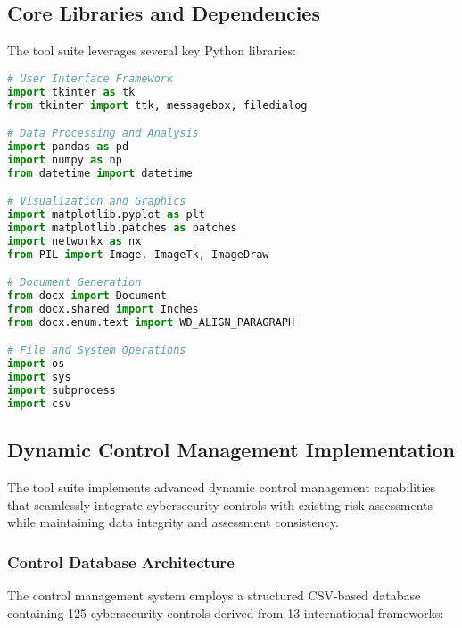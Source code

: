 \documentclass[binding=0.6cm]{sapthesis}
\begin{document}
\subsection{Core Libraries and Dependencies}

The tool suite leverages several key Python libraries:

\begin{lstlisting}[language=Python, caption=Core Dependencies Structure]
# User Interface Framework
import tkinter as tk
from tkinter import ttk, messagebox, filedialog

# Data Processing and Analysis
import pandas as pd
import numpy as np
from datetime import datetime

# Visualization and Graphics
import matplotlib.pyplot as plt
import matplotlib.patches as patches
import networkx as nx
from PIL import Image, ImageTk, ImageDraw

# Document Generation
from docx import Document
from docx.shared import Inches
from docx.enum.text import WD_ALIGN_PARAGRAPH

# File and System Operations
import os
import sys
import subprocess
import csv
\end{lstlisting}

\subsection{Dynamic Control Management Implementation}

The tool suite implements advanced dynamic control management capabilities that seamlessly integrate cybersecurity controls with existing risk assessments while maintaining data integrity and assessment consistency.

\subsubsection{Control Database Architecture}

The control management system employs a structured CSV-based database containing 125 cybersecurity controls derived from 13 international frameworks:
\end{document}
